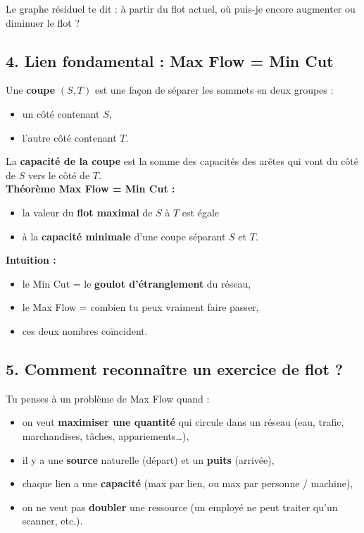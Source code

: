 Le graphe résiduel te dit : \og à partir du flot actuel, où puis-je encore augmenter ou diminuer le flot ?\fg{}

\subsection*{4. Lien fondamental : Max Flow = Min Cut}

Une \textbf{coupe} $(S,T)$ est une façon de séparer les sommets en deux groupes :
\begin{itemize}
    \item un côté contenant $S$,
    \item l’autre côté contenant $T$.
\end{itemize}

La \textbf{capacité de la coupe} est la somme des capacités des arêtes qui vont du côté de $S$ vers le côté de $T$. \\

\textbf{Théorème Max Flow = Min Cut :}
\begin{itemize}
    \item la valeur du \textbf{flot maximal} de $S$ à $T$ est égale
    \item à la \textbf{capacité minimale} d’une coupe séparant $S$ et $T$.
\end{itemize}

\textbf{Intuition :}
\begin{itemize}
    \item le Min Cut = le \textbf{goulot d’étranglement} du réseau,
    \item le Max Flow = combien tu peux vraiment faire passer,
    \item ces deux nombres coïncident.
\end{itemize}

\subsection*{5. Comment reconnaître un exercice de flot ?}

Tu penses à un problème de Max Flow quand :
\begin{itemize}
    \item on veut \textbf{maximiser une quantité} qui \og circule\fg{} dans un réseau (eau, trafic, marchandises, tâches, appariements…),
    \item il y a une \textbf{source} naturelle (départ) et un \textbf{puits} (arrivée),
    \item chaque lien a une \textbf{capacité} (max par lien, ou max par personne / machine),
    \item on ne veut pas \textbf{doubler} une ressource (un employé ne peut traiter qu’un scanner, etc.).
\end{itemize}

